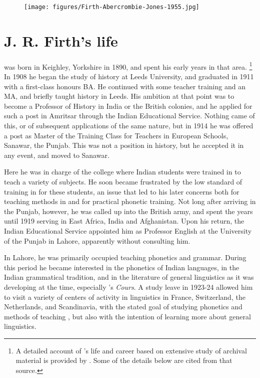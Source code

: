\begin{figure}
  \texttt{[image: figures/Firth-Abercrombie-Jones-1955.jpg]}
  \caption{}
  \label{fig:ch.firth:firth-abercrombie-jones}
\end{figure}


\section{J. R. Firth's life}


{\Firth} was born in Keighley, Yorkshire in 1890, and spent his early
years in that area. \footnote{A detailed account of {\Firth}'s life and
  career based on extensive study of archival material is provided by
  \citet{plug08:firth.bio}. Some of the details below are cited from
  that source.} In 1908 he began the study of history at Leeds
University, and graduated in 1911 with a first-class honours BA. He
continued with some teacher training and an MA, and briefly taught
history in Leeds. His ambition at that point was to become a Professor
of History in India or the British colonies, and he applied for such a
post in Amritsar through the Indian Educational Service. Nothing came
of this, or of subsequent applications of the same nature, but in 1914
he was offered a post as Master of the Training Class for Teachers in
European Schools, Sanawar, the Punjab. This was not a position in
history, but he accepted it in any event, and moved to Sanawar.

Here he was in charge of the college where Indian students were
trained in  to teach a variety of subjects. He soon became
frustrated by the low standard of training in  for these
students, an issue that led to his later concerns both for teaching
methods in  and for practical phonetic training. Not long after
arriving in the Punjab, however, he was called up into the British
army, and spent the years until 1919 serving in East Africa, India and
Afghanistan. Upon his return, the Indian Educational Service appointed
him as Professor {English} at the University of the Punjab in Lahore,
apparently without consulting him.

In Lahore, he was primarily occupied teaching  phonetics and
grammar. During this period he became interested in the phonetics of
Indian languages, in the Indian grammatical tradition, and in the
literature of general linguistics as it was developing at the time,
especially {\Saussure}'s \textsl{Cours}. A study leave in 1923-24 allowed
him to visit a variety of centers of activity in linguistics in
France, Switzerland, the Netherlands, and Scandinavia, with the stated
goal of studying phonetics and methods of teaching , but also
with the intention of learning more about general linguistics.

